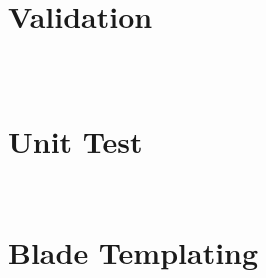 \begin{lstlisting}[language=PHP]

\end{lstlisting}




\begin{lstlisting}[language=PHP]

\end{lstlisting}



\begin{lstlisting}[language=PHP]

\end{lstlisting}


\chapter{Validation}

\begin{lstlisting}[language=PHP]

\end{lstlisting}



\begin{lstlisting}[language=PHP]

\end{lstlisting}



\begin{lstlisting}[language=PHP]

\end{lstlisting}

\chapter{Unit Test}

\begin{lstlisting}[language=PHP]

\end{lstlisting}




\begin{lstlisting}[language=PHP]

\end{lstlisting}


\chapter{Blade Templating}

\begin{lstlisting}[language=PHP]

\end{lstlisting}




